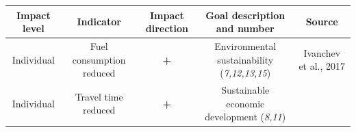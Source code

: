 \documentclass[
]{book}
\begin{document}
\begin{longtable}[]{@{}ccccc@{}}
\toprule
\begin{minipage}[b]{0.17\columnwidth}\centering
Impact level\strut
\end{minipage} & \begin{minipage}[b]{0.16\columnwidth}\centering
Indicator\strut
\end{minipage} & \begin{minipage}[b]{0.17\columnwidth}\centering
Impact direction\strut
\end{minipage} & \begin{minipage}[b]{0.17\columnwidth}\centering
Goal description and number\strut
\end{minipage} & \begin{minipage}[b]{0.17\columnwidth}\centering
Source\strut
\end{minipage}\tabularnewline
\midrule
\endhead
\begin{minipage}[t]{0.17\columnwidth}\centering
Individual\strut
\end{minipage} & \begin{minipage}[t]{0.16\columnwidth}\centering
Fuel consumption reduced\strut
\end{minipage} & \begin{minipage}[t]{0.17\columnwidth}\centering
\textbf{+}\strut
\end{minipage} & \begin{minipage}[t]{0.17\columnwidth}\centering
Environmental sustainability (\emph{7,12,13,15})\strut
\end{minipage} & \begin{minipage}[t]{0.17\columnwidth}\centering
Ivanchev et al., 2017\strut
\end{minipage}\tabularnewline
\begin{minipage}[t]{0.17\columnwidth}\centering
Individual\strut
\end{minipage} & \begin{minipage}[t]{0.16\columnwidth}\centering
Travel time reduced\strut
\end{minipage} & \begin{minipage}[t]{0.17\columnwidth}\centering
\textbf{+}\strut
\end{minipage} & \begin{minipage}[t]{0.17\columnwidth}\centering
Sustainable economic development (\emph{8,11})\strut
\end{minipage} & \begin{minipage}[t]{0.17\columnwidth}\centering

\end{minipage}
\end{longtable}
\end{document}
